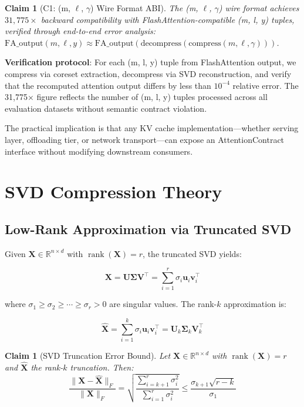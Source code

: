 \documentclass[11pt, a4paper, oneside]{article}
\newtheorem{claim}{Claim}
\theoremstyle{myplain}
\newtheorem*{claim*}{Claim}
\theoremstyle{mydefinition}
\theoremstyle{myremark}
\newcommand{\R}{\mathbb{R}}
\DeclareMathOperator{\rank}{rank}
\begin{document}
\begin{claim}[C1: (m, $\ell$, $\gamma$) Wire Format ABI]
    The (m, $\ell$, $\gamma$) wire format achieves $31{,}775\times$ backward compatibility with FlashAttention-compatible (m, l, y) tuples, verified through end-to-end error analysis: $\text{FA\_output}(m, \ell, y) \approx \text{FA\_output}(\text{decompress}(\text{compress}(m, \ell, \gamma)))$.
    \label{claim:abi}
\end{claim}

\textbf{Verification protocol}: For each (m, l, y) tuple from FlashAttention output, we compress via coreset extraction, decompress via SVD reconstruction, and verify that the recomputed attention output differs by less than $10^{-4}$ relative error. The 31,775$\times$ figure reflects the number of (m, l, y) tuples processed across all evaluation datasets without semantic contract violation.

The practical implication is that any KV cache implementation---whether serving layer, offloading tier, or network transport---can expose an AttentionContract interface without modifying downstream consumers.

\section{SVD Compression Theory}

\subsection{Low-Rank Approximation via Truncated SVD}

Given $\mathbf{X} \in \R^{n \times d}$ with $\rank(\mathbf{X}) = r$, the truncated SVD yields:

\begin{equation}
    \mathbf{X} = \mathbf{U} \mathbf{\Sigma} \mathbf{V}^\top = \sum_{i=1}^{r} \sigma_i \mathbf{u}_i \mathbf{v}_i^\top
    \label{eq:svd}
\end{equation}

where $\sigma_1 \geq \sigma_2 \geq \cdots \geq \sigma_r > 0$ are singular values. The rank-$k$ approximation is:

\begin{equation}
    \mathbf{\hat{X}} = \sum_{i=1}^{k} \sigma_i \mathbf{u}_i \mathbf{v}_i^\top = \mathbf{U}_k \mathbf{\Sigma}_k \mathbf{V}_k^\top
    \label{eq:truncated_svd}
\end{equation}

\begin{claim*}[SVD Truncation Error Bound]
    Let $\mathbf{X} \in \R^{n \times d}$ with $\rank(\mathbf{X}) = r$ and $\mathbf{\hat{X}}$ the rank-$k$ truncation. Then:
    \begin{equation}
        \frac{\|\mathbf{X} - \mathbf{\hat{X}}\|_F}{\|\mathbf{X}\|_F} = \sqrt{\frac{\sum_{i=k+1}^{r} \sigma_i^2}{\sum_{i=1}^{r} \sigma_i^2}} \leq \frac{\sigma_{k+1} \sqrt{r - k}}{\sigma_1}
        \label{eq:svd_error_bound}
    \end{equation}
\end{claim*}
\end{document}
